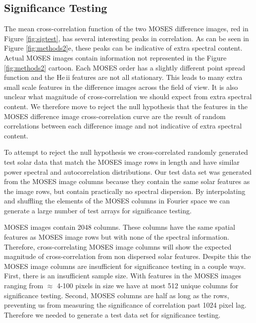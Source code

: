 	
	\subsection{Significance Testing}\label{sec:sigtesting}
	
		The mean cross-correlation function of the two MOSES difference images, red in Figure \ref{fig:sigtest}, has several interesting peaks in correlation.  
		As can be seen in Figure \ref{fig:methods2}e, these peaks can be indicative of extra spectral content.  
		Actual MOSES images contain information not represented in the Figure \ref{fig:methods2} cartoon.  
		Each MOSES order has a slightly different point spread function and the He\,{\sc ii} features are not all stationary.  
		This leads to many extra small scale features in the difference images across the field of view.  
		It is also unclear what magnitude of cross-correlation we should expect from extra spectral content.  
		We therefore move to reject the null hypothesis that the features in the MOSES difference image cross-correlation curve are the result of random correlations between each difference image and not indicative of extra spectral content.  
	
		To attempt to reject the null hypothesis we cross-correlated randomly generated test solar data that match the MOSES image rows in length and have similar power spectral and autocorrelation distributions.  
		Our test data set was generated from the MOSES image columns because they contain the same solar features as the image rows, but contain practically no spectral dispersion.  
		By interpolating and shuffling the elements of the MOSES columns in Fourier space we can generate a large number of test arrays for significance testing.
	
		MOSES images contain 2048 columns.  
		These columns have the same spatial features as MOSES image rows but with none of the spectral information.  
		Therefore, cross-correlating MOSES image columns will show the expected magnitude of cross-correlation from non dispersed solar features.  
		Despite this the MOSES image columns are insufficient for significance testing in a couple ways.  First, there is an insufficient sample size.  
		With features in the MOSES images ranging from $\approx$ 4-100 pixels in size we have at most 512 unique columns for significance testing.  
		Second, MOSES columns are half as long as the rows, preventing us from measuring the significance of correlation past 1024 pixel lag.  Therefore we needed to generate a test data set for significance testing.
	
